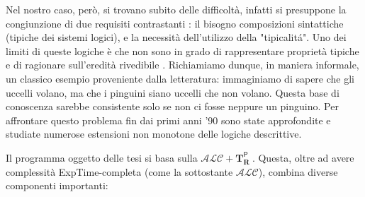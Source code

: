 Nel nostro caso, però, si trovano subito delle difficoltà, infatti si presuppone 
la congiunzione di due requisiti contrastanti : il bisogno composizioni sintattiche 
(tipiche dei sistemi logici), e la necessità dell'utilizzo della "tipicalitá".
Uno dei limiti di queste logiche è che non sono in grado di rappresentare proprietà tipiche
e di ragionare sull'eredità rivedibile \cite{ProbOfEx}.
Richiamiamo dunque, in maniera informale, un classico esempio proveniente dalla letteratura: 
immaginiamo di sapere che gli uccelli volano, ma che i pinguini siano uccelli che non volano.
Questa base di conoscenza sarebbe consistente solo se non ci fosse neppure un pinguino. 
Per affrontare questo problema fin dai primi anni '90 sono state approfondite e studiate 
numerose estensioni non monotone delle logiche descrittive.\par
Il programma oggetto delle tesi si basa sulla $\mathcal {ALC}+\mathbf{T}_\mathbf{R}^{ \textsf {P} }\ $. 
Questa, oltre ad avere complessità ExpTime-completa (come la sottostante $\mathcal {ALC}$), combina diverse componenti importanti:
